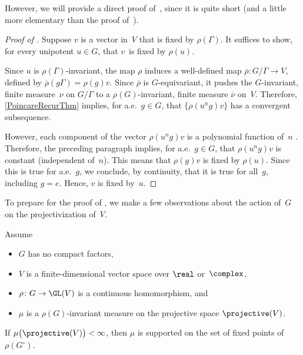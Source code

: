 However, we will provide a direct proof of~, since it is quite short (and a little more elementary than the proof of~).

\begin{proof}[Proof of ]
Suppose $v$ is a vector in~$V$ that is fixed by $\rho(\Gamma)$. It suffices to show, for every unipotent $u \in G$, that $v$~is fixed by $\rho(u)$.

Since $u$ is $\rho(\Gamma)$-invariant, the map $\rho$ induces a well-defined map $\overline\rho \colon G/\Gamma \to V$, defined by $\overline\rho(g\Gamma) = \rho(g) v$. Since $\overline\rho$ is $G$-equivariant, it pushes the $G$-invariant, finite measure~$\nu$ on $G/\Gamma$ to a $\rho(G)$-invariant, finite measure $\overline\nu$ on~$V$. Therefore, \cref{PoincareRecurThm} implies, for a.e.\ $g \in G$, that $\bigl\{ \rho(u^n g) v \bigr\}$ has a convergent subsequence.

However, each component of the vector $\rho(u^n g) v$ is a polynomial function of~$n$ . Therefore, the preceding paragraph implies, for a.e.\ $g \in G$, that $\rho(u^n g) v$ is constant (independent of~$n$). This means that $\rho(g) v$ is fixed by $\rho(u)$. Since this is true for a.e.~$g$, we conclude, by continuity, that it is true for all~$g$, including $g = e$. Hence, $v$ is fixed by~$u$.
\end{proof}

To prepare for the proof of , we make a few observations about the action of~$G$ on the projectivization of~$V$.

\begin{prop} \label{mu(PV)}
 Assume
 \begin{itemize}
 \item $G$ has no compact factors,
 \item $V$ is a finite-dimensional vector space over
$\real$ or~$\complex$,
 \item $\rho \colon G \to \GL(V)$ is a continuous homomorphism, and
 \item $\mu$ is a $\rho(G)$-invariant measure
on the projective space $\projective(V)$.%
 \end{itemize}
 If $\mu \bigl( \projective(V) \bigr) < \infty$, then $\mu$ is supported on the set of fixed points of $\rho(G^\circ)$.
 \end{prop}

